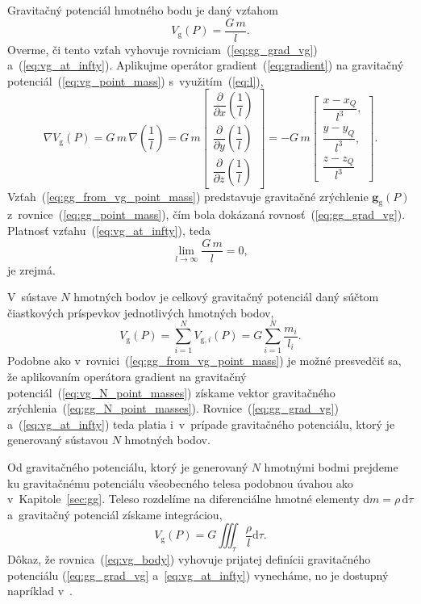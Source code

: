 \documentclass[a4paper,12pt]{book}
\newcommand{\diff}{\mathrm d}
\newcommand{\gidx}{\mathrm g}
\let\vec\mathbf
\begin{document}
Gravitačný potenciál hmotného bodu je daný vzťahom
%
\begin{equation}
\label{eq:vg_point_mass}
V_\gidx(P) = \frac{G \, m}{l}{.}
\end{equation}
%
Overme, či tento vzťah vyhovuje rovniciam~(\ref{eq:gg_grad_vg})
a~(\ref{eq:vg_at_infty}).  Aplikujme operátor gradient~(\ref{eq:gradient})
na gravitačný potenciál~(\ref{eq:vg_point_mass}) s~využitím~(\ref{eq:l}),
%
\begin{equation}
\label{eq:gg_from_vg_point_mass}
\nabla V_\gidx(P) = G \, m \, \nabla \left( \frac{1}{l} \right) =
%
G \, m
\begin{bmatrix}
\dfrac{\partial}{\partial x} \left( \dfrac{1}{l} \right)\\[2ex]
\dfrac{\partial}{\partial y} \left( \dfrac{1}{l} \right)\\[2ex]
\dfrac{\partial}{\partial z} \left( \dfrac{1}{l} \right)
\end{bmatrix}
%
=
%
-G \, m
%
\begin{bmatrix}
\dfrac{x - x_Q}{l^3}{,}\\[2ex]
\dfrac{y - y_Q}{l^3}{,}\\[2ex]
\dfrac{z - z_Q}{l^3}
\end{bmatrix}
{.}
\end{equation}
%
Vzťah~(\ref{eq:gg_from_vg_point_mass}) predstavuje gravitačné zrýchlenie $\vec 
g_\gidx(P)$ z~rovnice~(\ref{eq:gg_point_mass}), čím bola dokázaná 
rovnosť~(\ref{eq:gg_grad_vg}).  Platnosť vzťahu~(\ref{eq:vg_at_infty}), teda
%
\begin{equation}
\lim_{l \to \infty} \frac{G \, m}{l} = 0{,}
\end{equation}
%
je zrejmá.

V~sústave $N$ hmotných bodov je celkový gravitačný potenciál daný súčtom
čiastkových príspevkov jednotlivých hmotných bodov,
%
\begin{equation}
\label{eq:vg_N_point_masses}
V_\gidx(P) = \sum_{i = 1}^{N} V_{\gidx,i}(P) = G \sum_{i = 1}^{N}\frac{
m_i}{l_i}{.}
\end{equation}
%
Podobne ako v~rovnici~(\ref{eq:gg_from_vg_point_mass}) je možné
presvedčiť sa, že aplikovaním operátora gradient na gravitačný
potenciál~(\ref{eq:vg_N_point_masses}) získame vektor gravitačného
zrýchlenia~(\ref{eq:gg_N_point_masses}).  Rovnice~(\ref{eq:gg_grad_vg}) 
a~(\ref{eq:vg_at_infty}) teda platia i~v~prípade gravitačného
potenciálu, ktorý je generovaný sústavou $N$ hmotných bodov.

Od gravitačného potenciálu, ktorý je generovaný $N$ hmotnými bodmi prejdeme ku
gravitačnému potenciálu všeobecného telesa podobnou úvahou ako
v~Kapitole~\ref{sec:gg}.  Teleso rozdelíme na diferenciálne hmotné elementy
$\diff m = \rho \, \diff \tau$ a~gravitačný potenciál získame integráciou,
%
\begin{equation}
\label{eq:vg_body}
V_\gidx(P) = G \iiint_{\tau} \frac{\rho}{l} \diff\tau{.}
\end{equation}
%
Dôkaz, že rovnica~(\ref{eq:vg_body}) vyhovuje prijatej definícii gravitačného
potenciálu (\ref{eq:gg_grad_vg} a~\ref{eq:vg_at_infty}) vynecháme, no je
dostupný napríklad v~\textcite{MacMillan1930}.
\end{document}
